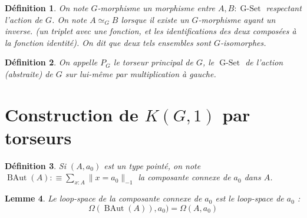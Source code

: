 \documentclass{article}
\DeclareMathOperator{\gset}{G-Set}
\DeclareMathOperator{\baut}{BAut}
\newtheorem{definition}{Définition}[section]
\newtheorem{lemme}[definition]{Lemme}
\begin{document}
\begin{definition}
  On note $G$-morphisme un morphisme entre $A,B : \gset$ respectant l'action de $G$.
  On note $A \simeq_{G} B$ lorsque il existe un $G$-morphisme ayant un inverse. (un triplet avec une fonction, et les identifications des deux composées à la fonction identité). On dit que deux tels ensembles sont $G$-isomorphes.
\end{definition}

\begin{definition}
  On appelle $P_{G}$ le torseur principal de $G$, le $\gset$ de l'action (abstraite) de $G$ sur lui-même par multiplication à gauche.
\end{definition}

\section{Construction de $K(G,1)$ par torseurs}

\begin{definition}
  Si $(A,a_0)$ est un type pointé, on note $\baut(A) :\equiv \sum_{x : A}\| x = a_{0} \|_{-1}$ la composante connexe de $a_0$ dans $A$.
\end{definition}

\begin{lemme}
  Le loop-space de la composante connexe de $a_0$ est le loop-space de $a_0$ :
  \[\Omega(\baut(A)), a_0) = \Omega(A,a_0)\]
\end{lemme}
\end{document}
